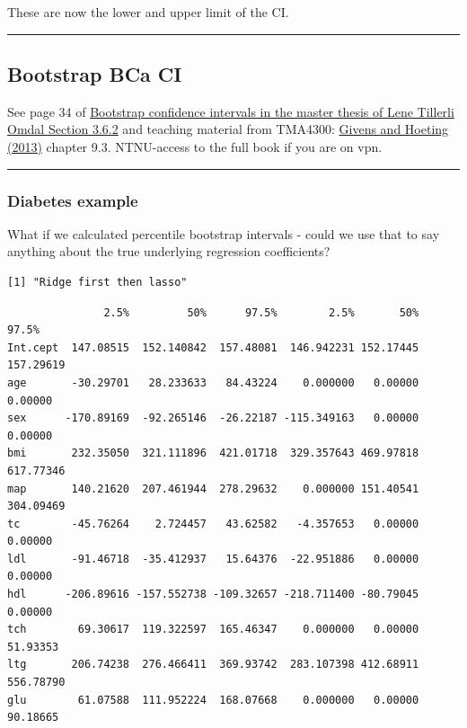 \documentclass[
  letterpaper,
  DIV=11,
  numbers=noendperiod]{scrartcl}
\begin{document}
These are now the lower and upper limit of the CI.

\begin{center}\rule{0.5\linewidth}{0.5pt}\end{center}

\hypertarget{bootstrap-bca-ci}{%
\subsection{Bootstrap BCa CI}\label{bootstrap-bca-ci}}

See page 34 of
\href{https://ntnuopen.ntnu.no/ntnu-xmlui/handle/11250/3026839}{Bootstrap
confidence intervals in the master thesis of Lene Tillerli Omdal Section
3.6.2} and teaching material from TMA4300:
\href{https://onlinelibrary.wiley.com/doi/book/10.1002/9781118555552}{Givens
and Hoeting (2013)} chapter 9.3. NTNU-access to the full book if you are
on vpn.

\begin{center}\rule{0.5\linewidth}{0.5pt}\end{center}

\hypertarget{diabetes-example-1}{%
\subsubsection{Diabetes example}\label{diabetes-example-1}}

What if we calculated percentile bootstrap intervals - could we use that
to say anything about the true underlying regression coefficients?

\begin{verbatim}
[1] "Ridge first then lasso"
\end{verbatim}

\begin{verbatim}
               2.5%         50%      97.5%        2.5%       50%     97.5%
Int.cept  147.08515  152.140842  157.48081  146.942231 152.17445 157.29619
age       -30.29701   28.233633   84.43224    0.000000   0.00000   0.00000
sex      -170.89169  -92.265146  -26.22187 -115.349163   0.00000   0.00000
bmi       232.35050  321.111896  421.01718  329.357643 469.97818 617.77346
map       140.21620  207.461944  278.29632    0.000000 151.40541 304.09469
tc        -45.76264    2.724457   43.62582   -4.357653   0.00000   0.00000
ldl       -91.46718  -35.412937   15.64376  -22.951886   0.00000   0.00000
hdl      -206.89616 -157.552738 -109.32657 -218.711400 -80.79045   0.00000
tch        69.30617  119.322597  165.46347    0.000000   0.00000  51.93353
ltg       206.74238  276.466411  369.93742  283.107398 412.68911 556.78790
glu        61.07588  111.952224  168.07668    0.000000   0.00000  90.18665
\end{verbatim}
\end{document}
